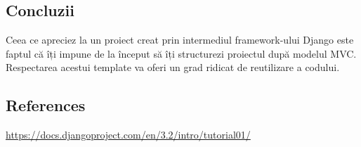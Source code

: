 \subsection{Concluzii}
\hspace{\parindent} Ceea ce apreciez la un proiect creat prin intermediul framework-ului Django este faptul că îți impune de la început să îți structurezi proiectul după modelul MVC. Respectarea acestui template va oferi un grad ridicat de reutilizare a codului.

\subsection{References}
\url{https://docs.djangoproject.com/en/3.2/intro/tutorial01/}
